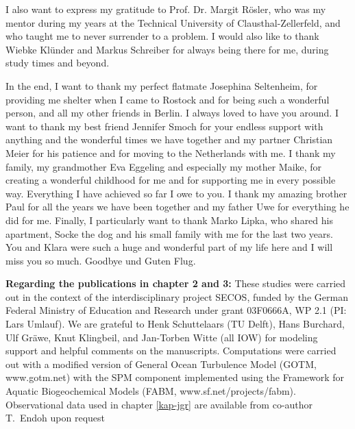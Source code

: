 I also want to express my gratitude to Prof. Dr. Margit Rösler, who was my 
mentor during my years at the Technical University of Clausthal-Zellerfeld, and 
who taught me to never surrender to a problem. I would also like to thank 
Wiebke Klünder and Markus Schreiber for always being there for me, during study 
times and beyond.

In the end, I want to thank my perfect flatmate Josephina Seltenheim, for 
providing me shelter when I came to Rostock and for being such a wonderful 
person, and all my other friends in Berlin. I always loved to have you around. 
I want to thank my best friend Jennifer Smoch for your endless support with 
anything and the wonderful times we have together and my partner Christian 
Meier for his patience and for moving to the Netherlands with me. I thank my 
family, my grandmother Eva Eggeling and especially my mother Maike, 
for creating a wonderful childhood for me and for supporting me in every 
possible way. Everything I have achieved so far I owe to you. I thank my amazing 
brother Paul for all the years we have been together and my father Uwe for 
everything he did for me. Finally, I particularly want to thank Marko 
Lipka, who shared his apartment, Socke the dog and his small family with me for 
the last two years. You and Klara were such a huge and wonderful part of my 
life here and I will miss you so much. Goodbye und Guten Flug. 

\textbf{Regarding the publications in chapter 2 and 3:} These studies were 
carried out in the context of the interdisciplinary project SECOS, funded by the 
German Federal Ministry of Education and Research under grant 03F0666A, WP 2.1 
(PI: Lars Umlauf). We are grateful to Henk Schuttelaars (TU Delft), Hans
Burchard, Ulf Gr{\"a}we, Knut Klingbeil, and Jan-Torben Witte (all IOW) for 
modeling support and helpful comments on the manuscripts.  Computations were
carried out with a modified version of General Ocean Turbulence Model
(GOTM, www.gotm.net) with the SPM component implemented using the
Framework for Aquatic Biogeochemical Models (FABM,
www.sf.net/projects/fabm). Observational data used in chapter \ref{kap-jgr} are
available from co-author T.\ Endoh upon request

\newpage

\tableofcontents
